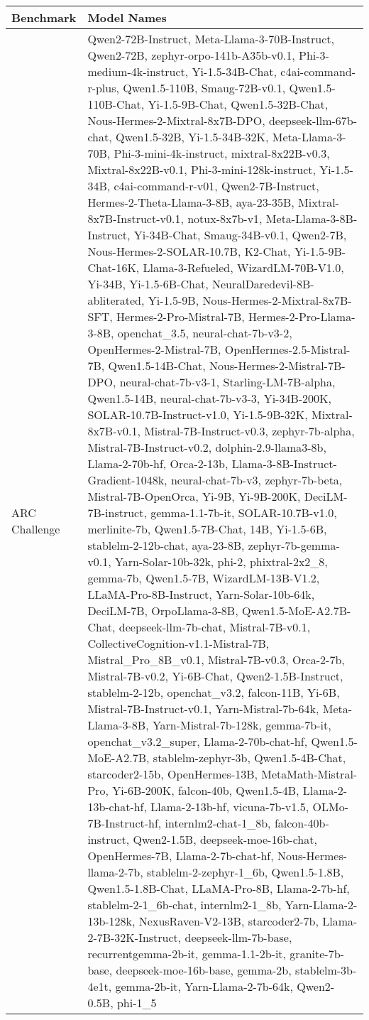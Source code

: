 \begin{table*}[htbp]
    \renewcommand{\arraystretch}{1.2}
    \centering
    \small
    \setlength{\tabcolsep}{0.5em} %
    \begin{tabular}{p{2cm}p{12cm}}
        \toprule
        \textbf{Benchmark} & \textbf{Model Names} \\
        \midrule
        ARC Challenge & Qwen2-72B-Instruct, Meta-Llama-3-70B-Instruct, Qwen2-72B, zephyr-orpo-141b-A35b-v0.1, Phi-3-medium-4k-instruct, Yi-1.5-34B-Chat, c4ai-command-r-plus, Qwen1.5-110B, Smaug-72B-v0.1, Qwen1.5-110B-Chat, Yi-1.5-9B-Chat, Qwen1.5-32B-Chat, Nous-Hermes-2-Mixtral-8x7B-DPO, deepseek-llm-67b-chat, Qwen1.5-32B, Yi-1.5-34B-32K, Meta-Llama-3-70B, Phi-3-mini-4k-instruct, mixtral-8x22B-v0.3, Mixtral-8x22B-v0.1, Phi-3-mini-128k-instruct, Yi-1.5-34B, c4ai-command-r-v01, Qwen2-7B-Instruct, Hermes-2-Theta-Llama-3-8B, aya-23-35B, Mixtral-8x7B-Instruct-v0.1, notux-8x7b-v1, Meta-Llama-3-8B-Instruct, Yi-34B-Chat, Smaug-34B-v0.1, Qwen2-7B, Nous-Hermes-2-SOLAR-10.7B, K2-Chat, Yi-1.5-9B-Chat-16K, Llama-3-Refueled, WizardLM-70B-V1.0, Yi-34B, Yi-1.5-6B-Chat, NeuralDaredevil-8B-abliterated, Yi-1.5-9B, Nous-Hermes-2-Mixtral-8x7B-SFT, Hermes-2-Pro-Mistral-7B, Hermes-2-Pro-Llama-3-8B, openchat\_3.5, neural-chat-7b-v3-2, OpenHermes-2-Mistral-7B, OpenHermes-2.5-Mistral-7B, Qwen1.5-14B-Chat, Nous-Hermes-2-Mistral-7B-DPO, neural-chat-7b-v3-1, Starling-LM-7B-alpha, Qwen1.5-14B, neural-chat-7b-v3-3, Yi-34B-200K, SOLAR-10.7B-Instruct-v1.0, Yi-1.5-9B-32K, Mixtral-8x7B-v0.1, Mistral-7B-Instruct-v0.3, zephyr-7b-alpha, Mistral-7B-Instruct-v0.2, dolphin-2.9-llama3-8b, Llama-2-70b-hf, Orca-2-13b, Llama-3-8B-Instruct-Gradient-1048k, neural-chat-7b-v3, zephyr-7b-beta, Mistral-7B-OpenOrca, Yi-9B, Yi-9B-200K, DeciLM-7B-instruct, gemma-1.1-7b-it, SOLAR-10.7B-v1.0, merlinite-7b, Qwen1.5-7B-Chat, 14B, Yi-1.5-6B, stablelm-2-12b-chat, aya-23-8B, zephyr-7b-gemma-v0.1, Yarn-Solar-10b-32k, phi-2, phixtral-2x2\_8, gemma-7b, Qwen1.5-7B, WizardLM-13B-V1.2, LLaMA-Pro-8B-Instruct, Yarn-Solar-10b-64k, DeciLM-7B, OrpoLlama-3-8B, Qwen1.5-MoE-A2.7B-Chat, deepseek-llm-7b-chat, Mistral-7B-v0.1, CollectiveCognition-v1.1-Mistral-7B, Mistral\_Pro\_8B\_v0.1, Mistral-7B-v0.3, Orca-2-7b, Mistral-7B-v0.2, Yi-6B-Chat, Qwen2-1.5B-Instruct, stablelm-2-12b, openchat\_v3.2, falcon-11B, Yi-6B, Mistral-7B-Instruct-v0.1, Yarn-Mistral-7b-64k, Meta-Llama-3-8B, Yarn-Mistral-7b-128k, gemma-7b-it, openchat\_v3.2\_super, Llama-2-70b-chat-hf, Qwen1.5-MoE-A2.7B, stablelm-zephyr-3b, Qwen1.5-4B-Chat, starcoder2-15b, OpenHermes-13B, MetaMath-Mistral-Pro, Yi-6B-200K, falcon-40b, Qwen1.5-4B, Llama-2-13b-chat-hf, Llama-2-13b-hf, vicuna-7b-v1.5, OLMo-7B-Instruct-hf, internlm2-chat-1\_8b, falcon-40b-instruct, Qwen2-1.5B, deepseek-moe-16b-chat, OpenHermes-7B, Llama-2-7b-chat-hf, Nous-Hermes-llama-2-7b, stablelm-2-zephyr-1\_6b, Qwen1.5-1.8B, Qwen1.5-1.8B-Chat, LLaMA-Pro-8B, Llama-2-7b-hf, stablelm-2-1\_6b-chat, internlm2-1\_8b, Yarn-Llama-2-13b-128k, NexusRaven-V2-13B, starcoder2-7b, Llama-2-7B-32K-Instruct, deepseek-llm-7b-base, recurrentgemma-2b-it, gemma-1.1-2b-it, granite-7b-base, deepseek-moe-16b-base, gemma-2b, stablelm-3b-4e1t, gemma-2b-it, Yarn-Llama-2-7b-64k, Qwen2-0.5B, phi-1\_5 \\

\end{tabular}
\end{table*}
